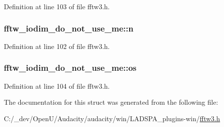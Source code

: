 Definition at line 103 of file fftw3.\+h.

\subsubsection[{\texorpdfstring{n}{n}}]{ fftw\+\_\+iodim\+\_\+do\+\_\+not\+\_\+use\+\_\+me\+::n}\hypertarget{structfftw__iodim__do__not__use__me_aa9ceb61afc1731380bdb48305aa40ce0}{}\label{structfftw__iodim__do__not__use__me_aa9ceb61afc1731380bdb48305aa40ce0}


Definition at line 102 of file fftw3.\+h.

\subsubsection[{\texorpdfstring{os}{os}}]{ fftw\+\_\+iodim\+\_\+do\+\_\+not\+\_\+use\+\_\+me\+::os}\hypertarget{structfftw__iodim__do__not__use__me_acff6a6b2225f610d3bee5380e801abb4}{}\label{structfftw__iodim__do__not__use__me_acff6a6b2225f610d3bee5380e801abb4}


Definition at line 104 of file fftw3.\+h.



The documentation for this struct was generated from the following file\+:\begin{DoxyCompactItemize}
\item 
C\+:/\+\_\+dev/\+Open\+U/\+Audacity/audacity/win/\+L\+A\+D\+S\+P\+A\+\_\+plugins-\/win/\hyperlink{fftw3_8h}{fftw3.\+h}\end{DoxyCompactItemize}
